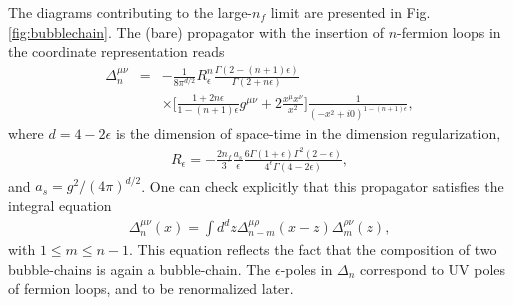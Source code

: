 The diagrams contributing to the large-$n_f$ limit are presented in Fig.\ref{fig:bubblechain}. 
The (bare) propagator with the insertion of $n$-fermion loops in the coordinate representation reads
\begin{eqnarray}
\Delta_n^{\mu\nu}&=&-\frac{1}{8\pi^{d/2}}R_\epsilon^n\frac{\Gamma(2-(n+1)\epsilon)}{\Gamma(2+n\epsilon)}
\\\nonumber &&
\times\Big[\frac{1+2n\epsilon}{1-(n+1)\epsilon}g^{\mu\nu}+2\frac{x^\mu x^\nu}{x^2}\Big]\frac{1}{(-x^2+i0)^{1-(n+1)\epsilon}},
\end{eqnarray}
where $d=4-2\epsilon$ is the dimension of space-time in the dimension regularization, 
\begin{eqnarray}
R_\epsilon=-\frac{2n_f}{3}\frac{a_s}{\epsilon}\frac{6\Gamma(1+\epsilon)\Gamma^2(2-\epsilon)}{4^\epsilon\Gamma(4-2\epsilon)},
\end{eqnarray}
and $a_s=g^2/(4\pi)^{d/2}$. One can check explicitly that this propagator satisfies the integral equation
\begin{eqnarray}
\Delta_{n}^{\mu\nu}(x)=\int d^dz \Delta^{\mu\rho}_{n-m}(x-z)\Delta^{\rho\nu}_m(z),
\end{eqnarray}
with $1\leqslant m \leqslant n-1$. This equation reflects the fact that the composition of two bubble-chains is again a bubble-chain. The $\epsilon$-poles in $\Delta_n$ correspond to UV poles of fermion loops, and to be renormalized later.


